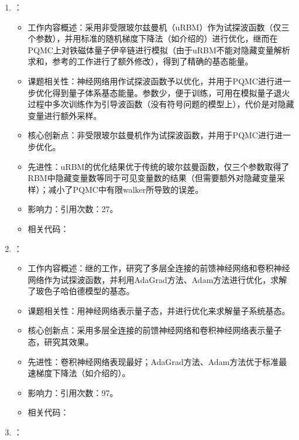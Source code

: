 \begin{enumerate}
\begin{itemize}
            \end{itemize}
            \item \citet{inack2018projective}：
            \begin{itemize}
                \item 工作内容概述：采用非受限玻尔兹曼机（uRBM）作为试探波函数（仅三个参数），并用标准的随机梯度下降法（如\citet{becca2017quantum}介绍的）进行优化，继而在PQMC上对铁磁体量子伊辛链进行模拟（由于uRBM不能对隐藏变量解析求和，参考\citet{vitiello1991green}的工作进行了额外修改），得到了精确的基态能量。
                \item 课题相关性：神经网络用作试探波函数予以优化，并用于PQMC进行进一步优化得到量子体系基态能量。参数少，便于训练，可用在模拟量子退火过程中多次训练作为引导波函数（没有符号问题的模型上），代价是对隐藏变量进行额外采样。
                \item 核心创新点：非受限玻尔兹曼机作为试探波函数，并用于PQMC进行进一步优化。
                \item 先进性：uRBM的优化结果优于传统的玻尔兹曼函数，仅三个参数取得了RBM中隐藏变量数等同于可见变量数的结果（但需要额外对隐藏变量采样）；减小了PQMC中有限walker所导致的误差。
                \item 影响力：引用次数：27。
                \item 相关代码：
            \end{itemize}
            \item \citet{saito2018machine}：
            \begin{itemize}
                \item 工作内容概述：继\citet{saito2017solving}的工作，研究了多层全连接的前馈神经网络和卷积神经网络作为试探波函数，并利用AdaGrad方法\citep{duchi2011adaptive}、Adam方法\citep{kingma2014adam}进行优化，求解了玻色子哈伯德模型的基态。
                \item 课题相关性：用神经网络表示量子态，并进行优化来求解量子系统基态。
                \item 核心创新点：采用多层全连接的前馈神经网络和卷积神经网络表示量子态，研究其效果。
                \item 先进性：卷积神经网络表现最好；AdaGrad方法\citep{duchi2011adaptive}、Adam方法\citep{kingma2014adam}优于标准最速梯度下降法（如\citet{becca2017quantum}介绍的）。
                \item 影响力：引用次数：97。
                \item 相关代码：
            \end{itemize}
            \item \citet{pilati2019self}：

\end{enumerate}

